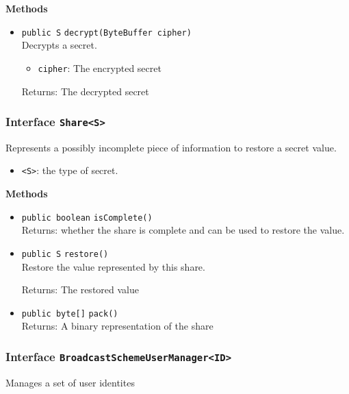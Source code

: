 \textbf{Methods}
\begin{itemize}
\item \lstinline|public S| \lstinline|decrypt|\lstinline|(ByteBuffer cipher)|\\
Decrypts a secret.
\begin{itemize}
\item \lstinline|cipher|: The encrypted secret
\end{itemize}

Returns: The decrypted secret

\end{itemize}

\subsubsection{Interface \lstinline|Share<S>|}
Represents a possibly incomplete piece of information to restore a secret value. \\


\begin{itemize}
\item \lstinline|<S>|: the type of secret.
\end{itemize}



\textbf{Methods}
\begin{itemize}
\item \lstinline|public boolean| \lstinline|isComplete|\lstinline|()|\\
Returns: whether the share is complete and can be used to restore
 the value.



\item \lstinline|public S| \lstinline|restore|\lstinline|()|\\
Restore the value represented by this share.

Returns: The restored value

\item \lstinline|public byte[]| \lstinline|pack|\lstinline|()|\\
Returns: A binary representation of the share



\end{itemize}

\subsubsection{Interface \lstinline|BroadcastSchemeUserManager<ID>|}
Manages a set of user identites \\


